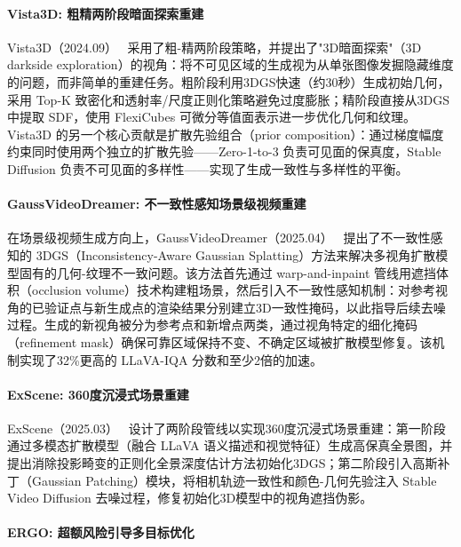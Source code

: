 \paragraph{Vista3D: 粗精两阶段暗面探索重建}

Vista3D（2024.09）~\cite{2409_12193} 采用了粗-精两阶段策略，并提出了"3D暗面探索"（3D darkside exploration）的视角：将不可见区域的生成视为从单张图像发掘隐藏维度的问题，而非简单的重建任务。粗阶段利用3DGS快速（约30秒）生成初始几何，采用 Top-K 致密化和透射率/尺度正则化策略避免过度膨胀；精阶段直接从3DGS中提取 SDF，使用 FlexiCubes 可微分等值面表示进一步优化几何和纹理。Vista3D 的另一个核心贡献是扩散先验组合（prior composition）：通过梯度幅度约束同时使用两个独立的扩散先验——Zero-1-to-3 负责可见面的保真度，Stable Diffusion 负责不可见面的多样性——实现了生成一致性与多样性的平衡。

\paragraph{GaussVideoDreamer: 不一致性感知场景级视频重建}

在场景级视频生成方向上，GaussVideoDreamer（2025.04）~\cite{2504_10001} 提出了不一致性感知的 3DGS（Inconsistency-Aware Gaussian Splatting）方法来解决多视角扩散模型固有的几何-纹理不一致问题。该方法首先通过 warp-and-inpaint 管线用遮挡体积（occlusion volume）技术构建粗场景，然后引入不一致性感知机制：对参考视角的已验证点与新生成点的渲染结果分别建立3D一致性掩码，以此指导后续去噪过程。生成的新视角被分为参考点和新增点两类，通过视角特定的细化掩码（refinement mask）确保可靠区域保持不变、不确定区域被扩散模型修复。该机制实现了32\%更高的 LLaVA-IQA 分数和至少2倍的加速。

\paragraph{ExScene: 360度沉浸式场景重建}

ExScene（2025.03）~\cite{2503_23881} 设计了两阶段管线以实现360度沉浸式场景重建：第一阶段通过多模态扩散模型（融合 LLaVA 语义描述和视觉特征）生成高保真全景图，并提出消除投影畸变的正则化全景深度估计方法初始化3DGS；第二阶段引入高斯补丁（Gaussian Patching）模块，将相机轨迹一致性和颜色-几何先验注入 Stable Video Diffusion 去噪过程，修复初始化3D模型中的视角遮挡伪影。

\paragraph{ERGO: 超额风险引导多目标优化}

